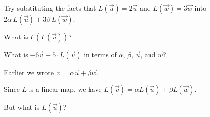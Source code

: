 \documentclass{ximera}
\begin{document}
\begin{question}
\begin{solution}
    \begin{hint}
      Try substituting the facts that $L(\vec{u}) = 2 \vec{u}$ and $L(\vec{w}) = 3 \vec{w}$ into $2\alpha\,L(\vec{u}) + 3\beta\,L(\vec{w})$.
    \end{hint}

    What is $L(L(\vec{v}))$?
    \begin{multiple-choice}
    \end{multiple-choice} 
  \end{solution}

  What is $-6 \vec{v} + 5 \cdot L(\vec{v})$ in terms of $\alpha$, $\beta$, $\vec{u}$, and $\vec{w}$?
  \begin{solution}
    \begin{hint}
      Earlier we wrote $\vec{v} = \alpha \vec{u} + \beta \vec{w}$.
    \end{hint}

    \begin{hint}
      Since $L$ is a linear map, we have $L(\vec{v}) = \alpha L(\vec{u}) + \beta L(\vec{w})$.
    \end{hint}

    \begin{multiple-choice}
    \end{multiple-choice} 
  \end{solution}

  \begin{solution}
    \begin{hint}
      \begin{question}
        \begin{solution}
          But what is $L(\vec{u})$?

          \begin{multiple-choice}
          \end{multiple-choice} 
        \end{solution}
      \end{question}
    \end{hint}


\end{solution}
\end{question}
\end{document}
